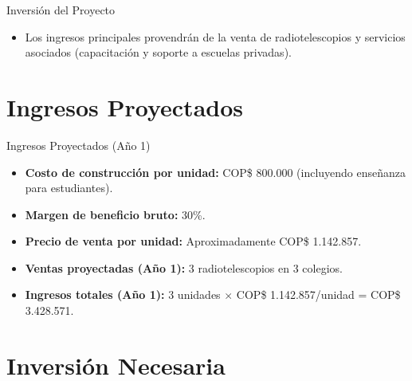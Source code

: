 \begin{frame}{Inversión del Proyecto}
  \begin{itemize}
    \item Los ingresos principales provendrán de la venta de
      radiotelescopios y servicios asociados (capacitación y soporte a
      escuelas privadas).
  \end{itemize}
\end{frame}

\section{Ingresos Proyectados}

\begin{frame}{Ingresos Proyectados (Año 1)}
  \begin{itemize}
    \item \textbf{Costo de construcción por unidad:} COP\$ 800.000
      (incluyendo enseñanza para estudiantes).
    \item \textbf{Margen de beneficio bruto:} 30\%.
    \item \textbf{Precio de venta por unidad:} Aproximadamente COP\$ 1.142.857.
    \item \textbf{Ventas proyectadas (Año 1):} 3 radiotelescopios en 3 colegios.
    \item \textbf{Ingresos totales (Año 1):} 3 unidades $\times$
      COP\$ 1.142.857/unidad = COP\$ 3.428.571.
  \end{itemize}
\end{frame}

\section{Inversión Necesaria}

